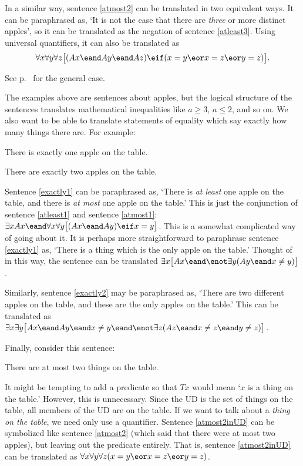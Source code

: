 In a similar way, sentence \ref{atmost2} can be translated in two equivalent ways. It can be paraphrased as, `It is not the case that there are \emph{three} or more distinct apples', so it can be translated as the negation of sentence \ref{atleast3}. Using universal quantifiers, it can also be translated as
$$\forall x\forall y\forall z\bigl[(Ax \eand Ay \eand Az) \eif (x=y \eor x=z \eor y=z)\bigr].$$

See p.~\pageref{summary.atmost} for the general case.

The examples above are sentences about apples, but the logical structure of the sentences translates mathematical inequalities like $a\geq 3$, $a \leq 2$, and so on. We also want to be able to translate statements of equality which say exactly how many things there are. For example:
\begin{earg}
\item[\ex{exactly1}] There is exactly one apple on the table.
\item[\ex{exactly2}] There are exactly two apples on the table.
\end{earg}

Sentence \ref{exactly1} can be paraphrased as, `There is \emph{at least} one apple on the table, and there is \emph{at most} one apple on the table.' This is just the conjunction of sentence \ref{atleast1} and sentence \ref{atmost1}: $\exists x Ax \eand \forall x\forall y\bigl[(Ax \eand Ay) \eif x=y\bigr]$. This is a somewhat complicated way of going about it. It is perhaps more straightforward to paraphrase sentence \ref{exactly1} as, `There is a thing which is the only apple on the table.' Thought of in this way, the sentence can be translated $\exists x\bigl[Ax \eand \enot\exists y(Ay \eand x\neq y)\bigr]$.

Similarly, sentence \ref{exactly2} may be paraphrased as, `There are two different apples on the table, and these are the only apples on the table.' This can be translated as $\exists x\exists y\bigl[Ax \eand Ay \eand x\neq y \eand \enot\exists z(Az \eand x\neq z \eand y\neq z)\bigr]$.

Finally, consider this sentence:
\begin{earg}
\item[\ex{atmost2inUD}] There are at most two things on the table.
\end{earg}
It might be tempting to add a predicate so that $Tx$ would mean `$x$ is a thing on the table.' However, this is unnecessary. Since the UD is the set of things on the table, all members of the UD are on the table. If we want to talk about a \emph{thing on the table}, we need only use a quantifier. Sentence \ref{atmost2inUD} can be symbolized like sentence \ref{atmost2} (which said that there were at most two apples), but leaving out the predicate entirely. That is, sentence \ref{atmost2inUD} can be translated as $\forall x \forall y \forall z(x=y \eor x=z \eor y=z)$.

